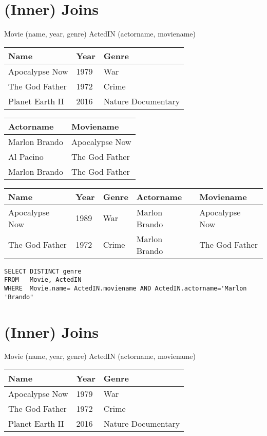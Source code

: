 \documentclass{article}
\begin{document}
\section*{(Inner) Joins}
Movie (name, year, genre)
ActedIN (actorname, moviename)

\begin{tabular}{lll}
\hline
Name & Year & Genre \\
\hline
Apocalypse Now & 1979 & War \\
The God Father & 1972 & Crime \\
Planet Earth II & 2016 & Nature Documentary \\
\hline
\end{tabular}

\begin{tabular}{ll}
\hline
Actorname & Moviename \\
\hline
Marlon Brando & Apocalypse Now \\
Al Pacino & The God Father \\
Marlon Brando & The God Father \\
\hline
\end{tabular}

\begin{tabular}{lllll}
\hline
Name & Year & Genre & Actorname & Moviename \\
\hline
Apocalypse Now & 1989 & War & Marlon Brando & Apocalypse Now \\
The God Father & 1972 & Crime & Marlon Brando & The God Father \\
\hline
\end{tabular}
\begin{verbatim}
SELECT DISTINCT genre
FROM   Movie, ActedIN
WHERE  Movie.name= ActedIN.moviename AND ActedIN.actorname='Marlon 'Brando"
\end{verbatim}

\section*{(Inner) Joins}
Movie (name, year, genre)
ActedIN (actorname, moviename)

\begin{tabular}{lll}
\hline
Name & Year & Genre \\
\hline
Apocalypse Now & 1979 & War \\
The God Father & 1972 & Crime \\
Planet Earth II & 2016 & Nature Documentary \\
\hline
\end{tabular}
\end{document}
